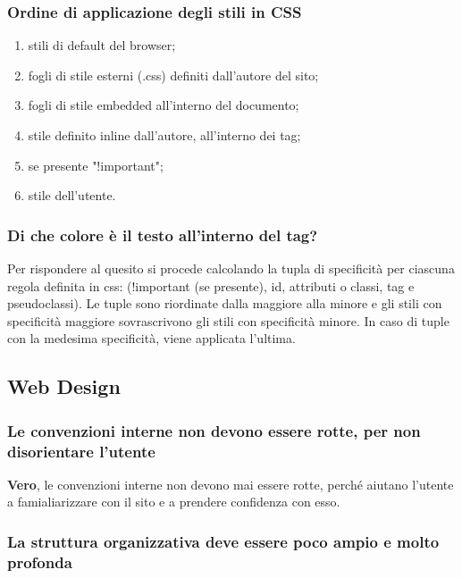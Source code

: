 \documentclass[12pt]{article}
\begin{document}
\subsubsection{Ordine di applicazione degli stili in CSS}

\begin{enumerate}
	\item stili di default del browser;
	\item fogli di stile esterni (.css) definiti dall'autore del sito;
	\item fogli di stile embedded all'interno del documento;
	\item stile definito inline dall'autore, all'interno dei tag;
	\item se presente "!important";
	\item stile dell'utente.
\end{enumerate}

\subsubsection{Di che colore è il testo all'interno del tag?}

Per rispondere al quesito si procede calcolando la tupla di specificità per
ciascuna regola definita in css: (!important (se presente), id, attributi o
classi, tag e pseudoclassi). Le tuple sono riordinate dalla maggiore alla minore
e gli stili con specificità maggiore sovrascrivono gli stili con specificità
minore. In caso di tuple con la medesima specificità, viene applicata l'ultima.

\subsection{Web Design}

\subsubsection{Le convenzioni interne non devono essere rotte, per non
	disorientare l'utente}

\textbf{Vero}, le convenzioni interne non devono mai essere rotte, perché
aiutano l'utente a famialiarizzare con il sito e a prendere confidenza con esso.

\subsubsection{La struttura organizzativa deve essere poco ampio e molto
	profonda}
\end{document}
